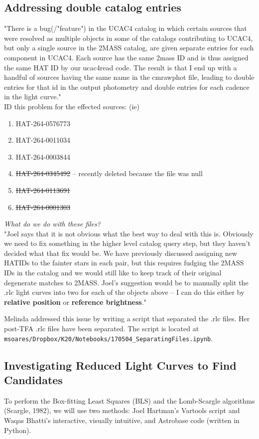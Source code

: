 \subsection*{Addressing double catalog entries}
"There is a bug(/"feature") in the UCAC4 catalog in which certain sources that were resolved as multiple objects in some of the catalogs contributing to UCAC4, but only a single source in the 2MASS catalog, are given separate entries for each component in UCAC4. Each source has the same 2mass ID and is thus assigned the same HAT ID by our ucac4read code. The result is that I end up with a handful of sources having the same name in the cmrawphot file, leading to double entries for that id in the output photometry and double entries for each cadence in the light curve." \\ 
ID this problem for the effected sources: (ie)
\begin{enumerate}
\item HAT-264-0576773
\item HAT-264-0011034
\item HAT-264-0003844
\item \sout{HAT-264-0345492} -- recently deleted because the file was null
\item \sout{HAT-264-0113691}
\item \sout{HAT-264-0001303}
\end{enumerate}

\textit{What do we do with these files?}\\
"Joel says that it is not obvious what the best way to deal with this is. 
Obviously we need to fix something in the higher level catalog query step, but they haven't decided what that fix would be. 
We have previously discussed assigning new HATIDs to the fainter stars in each pair, but this requires fudging the 2MASS IDs in the catalog and we would still like to keep track of their original degenerate matches to 2MASS.  
Joel's suggestion would be to manually split the .rlc light curves into two for each of the objects above -- I can do this either by \textbf{relative position} or \textbf{reference brightness}."

Melinda addressed this issue by writing a script that separated the .rlc files. Her post-TFA .rlc files have been separated. The script is located at \texttt{msoares/Dropbox/K20/Notebooks/170504\_SeparatingFiles.ipynb}.



\subsection*{Investigating Reduced Light Curves to Find Candidates}
To perform the Box-fitting Least Squares (BLS) and the Lomb-Scargle algorithms (Scargle, 1982), we will use two methods: Joel Hartman's Vartools script and Waqas Bhatti's interactive, visually intuitive, and Astrobase code (written in Python).

